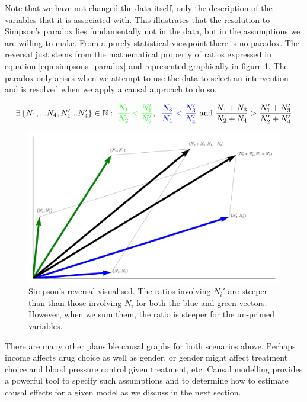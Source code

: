 \documentclass[11pt,a4paper,oneside]{book}
\newcommand{\set}[1]{\left\{#1\right\}}
\newcommand{\eqn}[1]{\begin{align}#1\end{align}}
\theoremstyle{plain}
\theoremstyle{definition}
\begin{document}
Note that we have not changed the data itself, only the description of the variables that it is associated with. This illustrates that the resolution to Simpson's paradox lies fundamentally not in the data, but in the assumptions we are willing to make. From a purely statistical viewpoint there is no paradox. The reversal just stems from the mathematical property of ratios expressed in equation \ref{eqn:simpsons_paradox} and represented graphically in figure \ref{fig:simpsons_vector}. The paradox only arises when we attempt to use the data to select an intervention and is resolved when we apply a causal approach to do so.

\eqn{
\label{eqn:simpsons_paradox}
\exists \set{N_1,...N_4, N_1'...N_4'} \in \mathbb{N} : \; 
\textcolor{green}{\frac{N_1}{N_2}< \frac{N_1'}{N_2'}}, \;\; 
\textcolor{blue}{ \frac{N_3}{N_4}<\frac{N_3'}{N_4'}}
 \text{ and } \frac{N_1+N_3}{N_2+N_4} > \frac{N_1'+N_3'}{N_2'+N_4'}
}

\begin{figure}
\centering
\includegraphics[scale=.4]{figures/simpson_vector}
\caption{Simpson's reversal visualised. The ratios involving $N_i'$ are steeper than than those involving $N_i$ for both the blue and green vectors. However, when we sum them, the ratio is steeper for the un-primed variables.}
\label{fig:simpsons_vector}
\end{figure}

There are many other plausible causal graphs for both scenarios above. Perhaps income affects drug choice as well as gender, or gender might affect treatment choice and blood pressure control given treatment, etc. Causal modelling provides a powerful tool to specify such assumptions and to determine how to estimate causal effects for a given model as we discuss in the next section.
\end{document}
